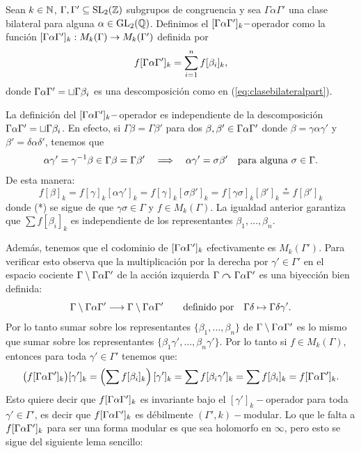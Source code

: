 \documentclass[../../tesis_maestria]{subfiles}
\begin{document}
\begin{defin}
  Sean $k\in\mathbb{N}$, $\Gamma,\Gamma'\subseteq\mathrm{SL}_2(\mathbb{Z})$ subgrupos de congruencia y sea
  $\Gamma\alpha\Gamma'$ una clase bilateral para alguna $\alpha\in\mathrm{GL}_2(\mathbb{Q})$. Definimos el
  $[\Gamma\alpha\Gamma']_k-$operador como la funci\'on $[\Gamma\alpha\Gamma']_k:M_k(\Gamma)\rightarrow M_k(\Gamma')$ definida por
  \[
    f[\Gamma\alpha\Gamma']_k=\sum_{i=1}^nf[\beta_i]_k,
  \]
  donde $\Gamma\alpha\Gamma'=\sqcup\Gamma\beta_i$ es una descomposici\'on como en (\ref{eq:clasebilateralpart}).
\end{defin}

\begin{nota}
  La definici\'on del $[\Gamma\alpha\Gamma']_k-$operador es independiente de la descomposici\'on
  $\Gamma\alpha\Gamma'=\sqcup\Gamma\beta_i$. En efecto, si $\Gamma\beta=\Gamma\beta'$ para dos $\beta,\beta'\in\Gamma\alpha\Gamma'$
  donde $\beta=\gamma\alpha\gamma'$ y $\beta'=\delta\alpha\delta'$, tenemos que
  \[
    \alpha\gamma'=\gamma^{-1}\beta\in\Gamma\beta=\Gamma\beta'\quad\Longrightarrow\quad
    \alpha\gamma'=\sigma\beta'
    \quad\text{para alguna }\sigma\in\Gamma.
  \]
  De esta manera:
  \[
    f[\beta]_k=f[\gamma]_k[\alpha\gamma']_k= f[\gamma]_k[\sigma\beta']_k=f[\gamma\sigma]_k[\beta']_k
    \overset{*}{=} f[\beta']_k
  \]
  donde (*) se sigue de que $\gamma\sigma\in\Gamma$ y $f\in M_k(\Gamma)$. La igualdad anterior
  garantiza que $\sum f[\beta_i]_k$ es independiente de los representantes $\beta_1,\ldots,\beta_n$.

  Adem\'as, tenemos que el codominio de $[\Gamma\alpha\Gamma']_k$ efectivamente es $M_k(\Gamma')$. Para verificar
  esto observa que la multiplicaci\'on por la derecha por $\gamma'\in\Gamma'$ en el espacio cociente
  $\Gamma\setminus\Gamma\alpha\Gamma'$ de la acci\'on izquierda $\Gamma\curvearrowright\Gamma\alpha\Gamma'$ es una biyecci\'on
  bien definida:
  \[
    \Gamma\setminus\Gamma\alpha\Gamma'\longrightarrow\Gamma\setminus\Gamma\alpha\Gamma' \qquad\text{definido por}\quad
    \Gamma\delta\mapsto \Gamma\delta\gamma'.
  \]
  Por lo tanto sumar sobre los representantes $\{\beta_1,\ldots,\beta_n\}$
  de $\Gamma\setminus\Gamma\alpha\Gamma'$ es lo mismo que sumar sobre los representantes
  $\{\beta_1\gamma',\ldots,\beta_n\gamma'\}$. Por lo tanto si $f\in M_k(\Gamma)$, entonces para toda
  $\gamma'\in\Gamma'$ tenemos que:
  \[
    \big(f[\Gamma\alpha\Gamma']_k\big)[\gamma']_k=\left( \sum f [\beta_i]_k \right)[\gamma']_k=\sum f[\beta_i\gamma']_k=
    \sum f[\beta_i]_k=f[\Gamma\alpha\Gamma']_k.
  \]
  Esto quiere decir que $f[\Gamma\alpha\Gamma']_k$ es invariante bajo el $[\gamma']_k-$operador para toda
  $\gamma'\in\Gamma'$, es decir que $f[\Gamma\alpha\Gamma']_k$ es d\'ebilmente $(\Gamma',k)-$modular. Lo que le
  falta a $f[\Gamma\alpha\Gamma']_k$ para ser una forma modular es que sea holomorfo en $\infty$, pero esto se
  sigue del siguiente lema sencillo:


\end{nota}
\end{document}
